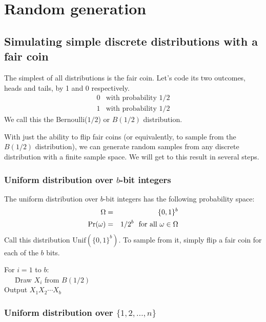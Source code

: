 \chapter{Random generation}

\section{Simulating simple discrete distributions with a fair coin}

The simplest of all distributions is the fair coin. Let's code its two outcomes, heads 
and tails, by 1 and 0 respectively.
$$ \begin{array}{ll}
    0 & \mbox{with probability $1/2$} \\
    1 & \mbox{with probability $1/2$}
\end{array}$$
We call this the Bernoulli($1/2$) or $B(1/2)$ distribution.

With just the ability to flip fair coins (or equivalently, to sample from the 
$B(1/2)$ distribution), we can generate random samples from any discrete distribution
with a finite sample space. We will get to this result in several steps.

\subsection{Uniform distribution over $b$-bit integers}

The uniform distribution over $b$-bit integers has the following probability space:
\begin{eqnarray*}
\Omega & = & \{0,1\}^b \\
\mbox{\rm Pr}(\omega) & = & 1/2^b \mbox{\ \ for all $\omega \in \Omega$}
\end{eqnarray*}
Call this distribution $\mbox{Unif}(\{0,1\}^b)$. To sample from it, simply flip a fair 
coin for each of the $b$ bits.

\begin{tt}
\begin{tabbing}
For $i = 1$ to $b$: \\
\ \ \ \= Draw $X_i$ from $B(1/2)$ \\
Output $X_1 X_2 \cdots X_b$
\end{tabbing}
\end{tt}

\subsection{Uniform distribution over $\{1,2,\ldots, n\}$}


